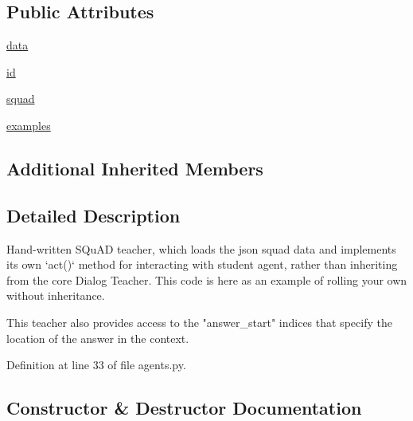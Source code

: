 \subsection*{Public Attributes}
\begin{DoxyCompactItemize}
\item 
\hyperlink{classparlai_1_1tasks_1_1squad_1_1agents_1_1IndexTeacher_a5642534b352e57c59dec249f9305d80d}{data}
\item 
\hyperlink{classparlai_1_1tasks_1_1squad_1_1agents_1_1IndexTeacher_a7c35d02788f1d513a7b815083cfecbf8}{id}
\item 
\hyperlink{classparlai_1_1tasks_1_1squad_1_1agents_1_1IndexTeacher_a419cb93430d8865d83f4968daf3b77d1}{squad}
\item 
\hyperlink{classparlai_1_1tasks_1_1squad_1_1agents_1_1IndexTeacher_a2ab5fd73dc8ce2b290aebd13f40540b5}{examples}
\end{DoxyCompactItemize}
\subsection*{Additional Inherited Members}


\subsection{Detailed Description}
\begin{DoxyVerb}Hand-written SQuAD teacher, which loads the json squad data and implements its own
`act()` method for interacting with student agent, rather than inheriting from the
core Dialog Teacher. This code is here as an example of rolling your own without
inheritance.

This teacher also provides access to the "answer_start" indices that specify the
location of the answer in the context.
\end{DoxyVerb}
 

Definition at line 33 of file agents.\+py.



\subsection{Constructor \& Destructor Documentation}
\mbox{\label{classparlai_1_1tasks_1_1squad_1_1agents_1_1IndexTeacher_ad198efa0868254d0ec2f45582e601849}} 
